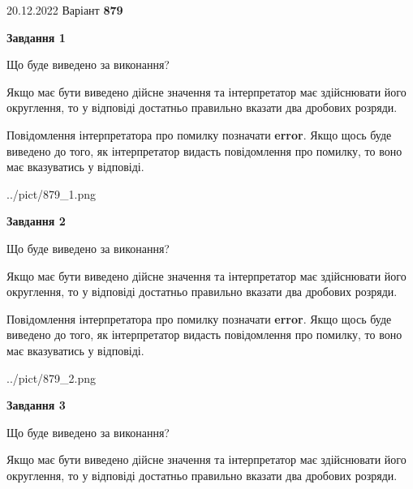 \documentclass[12pt, ukrainian]{article}
\begin{document}
{20.12.2022 Варіант \No \textbf { 879 }\par}
{
\begin {Large}

{\begin {center}\textbf{Завдання 1}\end {center}}\par
Що буде виведено за виконання? \par

Якщо має бути виведено дійсне значення та інтерпретатор має здійснювати його округлення, 
то у відповіді достатньо правильно вказати два дробових розряди.

Повідомлення інтерпретатора про помилку позначати \textbf{error}.
Якщо щось буде виведено до того, як інтерпретатор видасть повідомлення про помилку, 
то воно має вказуватись у відповіді. \par

\begin{center}
	{../pict/879_1.png}
\end{center}
\newpage

{\begin {center}\textbf{Завдання 2}\end {center}}\par
Що буде виведено за виконання? \par

Якщо має бути виведено дійсне значення та інтерпретатор має здійснювати його округлення, 
то у відповіді достатньо правильно вказати два дробових розряди.

Повідомлення інтерпретатора про помилку позначати \textbf{error}.
Якщо щось буде виведено до того, як інтерпретатор видасть повідомлення про помилку, 
то воно має вказуватись у відповіді. \par

\begin{center}
	{../pict/879_2.png}
\end{center}
\newpage

{\begin {center}\textbf{Завдання 3}\end {center}}\par
Що буде виведено за виконання? \par

Якщо має бути виведено дійсне значення та інтерпретатор має здійснювати його округлення, 
то у відповіді достатньо правильно вказати два дробових розряди.


\end{Large}}
\end{document}

